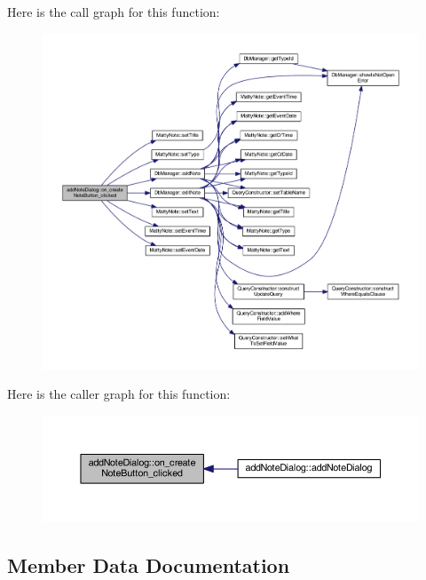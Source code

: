 Here is the call graph for this function\+:
\nopagebreak
\begin{figure}[H]
\begin{center}
\leavevmode
\includegraphics[width=350pt]{classaddNoteDialog_a67b28dc05851888a45774eb240d6e43d_cgraph}
\end{center}
\end{figure}
Here is the caller graph for this function\+:
\nopagebreak
\begin{figure}[H]
\begin{center}
\leavevmode
\includegraphics[width=350pt]{classaddNoteDialog_a67b28dc05851888a45774eb240d6e43d_icgraph}
\end{center}
\end{figure}


\subsection{Member Data Documentation}
\hypertarget{classaddNoteDialog_a4fd2dea6a480150e92f58bc0d415a83e}{}\label{classaddNoteDialog_a4fd2dea6a480150e92f58bc0d415a83e} 
